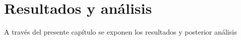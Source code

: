 
\chapter{Resultados y análisis}
\label{chp:resultados_analisis}
A través del presente capítulo se exponen los resultados y posterior análisis

%
%
%
